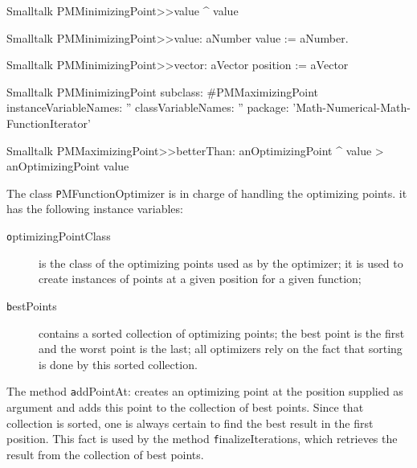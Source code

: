 
\begin{displaycode}{Smalltalk}
PMMinimizingPoint>>value
   ^ value
\end{displaycode}

\begin{displaycode}{Smalltalk}
PMMinimizingPoint>>value: aNumber
   value := aNumber.
\end{displaycode}

\begin{displaycode}{Smalltalk}
PMMinimizingPoint>>vector: aVector
    position := aVector
\end{displaycode}

\begin{displaycode}{Smalltalk}
PMMinimizingPoint subclass: #PMMaximizingPoint
   instanceVariableNames: ''
   classVariableNames: ''
   package: 'Math-Numerical-Math-FunctionIterator'
\end{displaycode}

\begin{displaycode}{Smalltalk}
PMMaximizingPoint>>betterThan: anOptimizingPoint
   ^ value > anOptimizingPoint value
\end{displaycode}
 
The class {\texttt PMFunctionOptimizer} is in charge of handling the
optimizing points. it has the following instance variables:
\begin{description}
  \item[\texttt optimizingPointClass] is the class of the optimizing
  points used as  by the optimizer; it is used
  to create instances of points at a given position for a given
  function;
  \item[\texttt bestPoints] contains a sorted collection of optimizing
  points; the best point is the first and the worst point is the
  last; all optimizers rely on the fact that sorting is done by this sorted collection.
\end{description}
The method {\texttt addPointAt:} creates an optimizing point at the
position supplied as argument and adds this point to the
collection of best points. Since that collection is sorted, one is
always certain to find the best result in the first position. This
fact is used by the method {\texttt finalizeIterations}, which
retrieves the result from the collection of best points.

